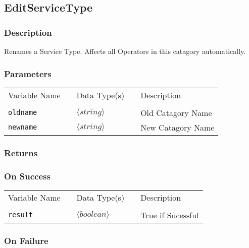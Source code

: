 \subsection{EditServiceType}

\subsubsection{Description}

Renames a Service Type. Affects all Operators in this catagory
automatically. 

\subsubsection{Parameters}

\begin{tabular}{lllll}
Variable Name	&		&	Data Type(s)		&	&	Description	\\
				&	&	&	&	\\
\verb!oldname! & \hspace{15mm} & $\langle string\rangle $ & \hspace{15mm} & Old Catagory Name \\
\verb!newname! & \hspace{15mm} & $\langle string\rangle $ & \hspace{15mm} & New Catagory Name \\
\end{tabular}

\subsubsection{Returns}

\subsubsection{On Success}

\begin{tabular}{lllll}
Variable Name	&		&	Data Type(s)		&	&	Description	\\
				&	&	&	&	\\
\verb!result! & \hspace{15mm} & $\langle boolean\rangle $ & \hspace{15mm} & True if Sucessful \\
\end{tabular}

\subsubsection{On Failure}

